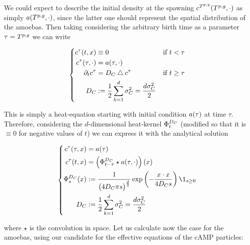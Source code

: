 We could expect to describe the initial density at the spawning $c^{T^{p,g}}(T^{p,g}, \cdot)$ as simply $a(T^{p,g}, \cdot)$, since the latter one should represent the spatial distribution of the amoebas.
Then taking considering the arbitrary birth time as a parameter $\tau = T^{p,g}$ we can write

\begin{equation}
\left\{
\begin{aligned}
c^\tau(t, x) 
& \equiv 0
&&\text{if } t < \tau
\\
c^\tau(\tau, \cdot) 
&= a(\tau, \cdot)
&&
\\
\partial_t c^\tau
&= D_C \bigtriangleup c^\tau
&&\text{if } t \geq \tau
\\
D_C
&:= \frac{1}{2} \sum_{k=1}^{d} \sigma_C^2 = \frac{d\sigma_C^2}{2}
&&
\end{aligned}
\right.
\end{equation}\label{ch3:eq:eff-eq-candidate-camp}

This is simply a heat-equation starting with initial condition $a(\tau)$ at time $\tau$. 
Therefore, considering the $d$-dimensional heat-kernel $\Phi_t^{D_C}$ (modified so that it is $\equiv 0$ for negative values of $t$) we can express it with the analytical solution

\begin{equation}\label{ch3:eq:eff-eq-camp-analytical-sol}
\left\{
\begin{aligned}
\cdens^\tau(\tau, x) 
&= \adens(\tau)
\\
\cdens^\tau(t, x) 
&= 
	\left(
		\heatkernel_{t-\tau}^{D_\camp} \star \adens(\tau, \cdot) 
	\right) (x)
\\
\heatkernel_s^{D_\camp}(x) &:= \frac{1}{
		\big( 4 D_\camp \pi s \big)^{\frac{d}{2}}
	}
	\exp \left(
		-\frac{x\cdot x}{4 D_\camp s}
	\right)
	\1_{s\geq 0}
\\
D_\camp
&:= \frac{1}{2} \sum_{k=1}^{d} \sigma_\camp^2 = \frac{d\sigma_\camp^2}{2}
\end{aligned}
\right.
\end{equation}

where $\star$ is the convolution in space.
Let us calculate now the case for the amoebas, using our candidate for the effective equations of the cAMP particles:

